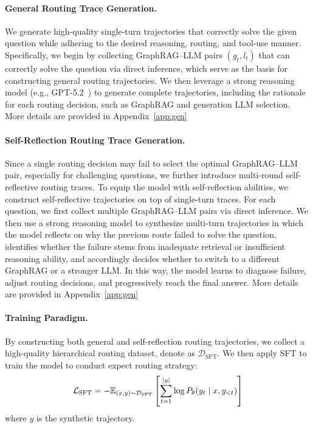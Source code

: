 \paragraph{General Routing Trace Generation.} We generate high-quality single-turn trajectories that correctly solve the given question while adhering to the desired reasoning, routing, and tool-use manner. Specifically, we begin by collecting GraphRAG--LLM pairs $(g_t, l_t)$ that can correctly solve the question via direct inference, which serve as the basis for constructing general routing trajectories. We then leverage a strong reasoning model (e.g., GPT-5.2~\cite{GPT5}) to generate complete trajectories, including the rationale for each routing decision, such as GraphRAG and generation LLM selection. More details are provided in Appendix~\ref{app:gen}

\paragraph{Self-Reflection Routing Trace Generation.}
Since a single routing decision may fail to select the optimal GraphRAG--LLM pair, especially for challenging questions, we further introduce multi-round self-reflective routing traces. To equip the model with self-reflection abilities, we construct self-reflective trajectories on top of single-turn traces. For each question, we first collect multiple GraphRAG–LLM pairs via direct inference. We then use a strong reasoning model to synthesize multi-turn trajectories in which the model reflects on why the previous route failed to solve the question, identifies whether the failure stems from inadequate retrieval or insufficient reasoning ability, and accordingly decides whether to switch to a different GraphRAG or a stronger LLM. In this way, the model learns to diagnose failure, adjust routing decisions, and progressively reach the final answer. More details are provided in Appendix~\ref{app:gen}

\paragraph{Training Paradigm.}
By constructing both general and self-reflection routing trajectories, we collect a high-quality hierarchical routing dataset, denote as $\mathcal{D}_{\mathrm{SFT}}$. We then apply SFT to train the model to conduct expect routing strategy:
\[
\small
\mathcal{L}_{\mathrm{SFT}}
=
-\mathbb{E}_{(x,y)\sim \mathcal{D}_{\mathrm{SFT}}}
\left[
\sum_{t=1}^{|y|}
\log P_\theta(y_t \mid x, y_{<t})
\right]
\]
where $y$ is the synthetic trajectory.




